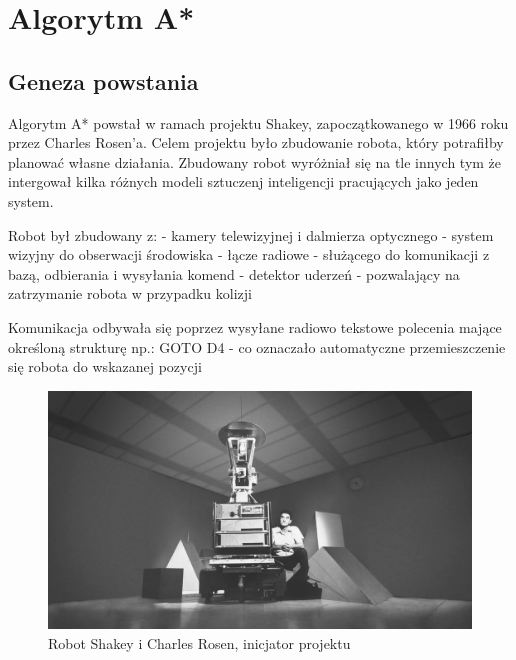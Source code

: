 \section{Algorytm A*}
\subsection{Geneza powstania}
Algorytm A* powstał w ramach projektu Shakey, zapoczątkowanego w 1966 roku przez Charles Rosen'a.
Celem projektu było zbudowanie robota, który potrafiłby planować własne działania. 
Zbudowany robot wyróżniał się na tle innych tym że intergował kilka różnych modeli sztuczenj 
inteligencji pracujących jako jeden system.

Robot był zbudowany z:
- kamery telewizyjnej i dalmierza optycznego - system wizyjny do obserwacji środowiska
- łącze radiowe - służącego do komunikacji z bazą, odbierania i wysyłania komend
- detektor uderzeń - pozwalający na zatrzymanie robota w przypadku kolizji

Komunikacja odbywała się poprzez wysyłane radiowo tekstowe polecenia mające określoną strukturę np.:
GOTO D4 - co oznaczało automatyczne przemieszczenie się robota do wskazanej pozycji
\begin{figure}[H]
	\centering
	\includegraphics[width=14cm]{pages/algorytm/zdjecia/shakey2.jpg}
	\caption{Robot Shakey i Charles Rosen, inicjator projektu \cite{robotShakey}}
	\label{fig:Rys}
\end{figure}


